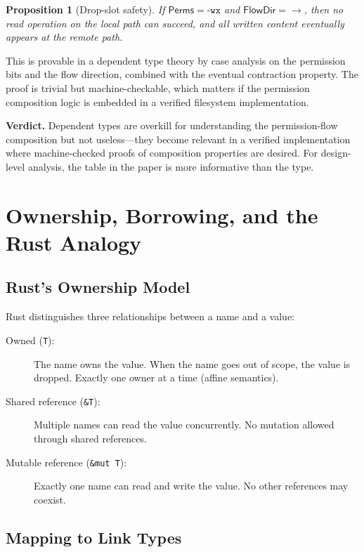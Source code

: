 \documentclass[11pt]{article}
\newtheorem{proposition}{Proposition}
\newcommand{\Perms}{\mathsf{Perms}}
\newcommand{\FlowDir}{\mathsf{FlowDir}}
\begin{document}
\begin{proposition}[Drop-slot safety]
If $\Perms = \texttt{-wx}$ and $\FlowDir = \rightarrow$, then no read
operation on the local path can succeed, and all written content eventually
appears at the remote path.
\end{proposition}

This is provable in a dependent type theory by case analysis on the permission
bits and the flow direction, combined with the eventual contraction property.
The proof is trivial but machine-checkable, which matters if the permission
composition logic is embedded in a verified filesystem implementation.

\textbf{Verdict.} Dependent types are overkill for understanding the
permission-flow composition but not useless---they become relevant in a
verified implementation where machine-checked proofs of composition properties
are desired. For design-level analysis, the table in the paper is more
informative than the type.


\section{Ownership, Borrowing, and the Rust Analogy}\label{sec:rust}

\subsection{Rust's Ownership Model}

Rust distinguishes three relationships between a name and a value:

\begin{description}
  \item[Owned (\texttt{T}):] The name owns the value. When the name goes out
    of scope, the value is dropped. Exactly one owner at a time (affine
    semantics).
  \item[Shared reference (\texttt{\&T}):] Multiple names can read the value
    concurrently. No mutation allowed through shared references.
  \item[Mutable reference (\texttt{\&mut T}):] Exactly one name can read and
    write the value. No other references may coexist.
\end{description}

\subsection{Mapping to Link Types}
\end{document}
